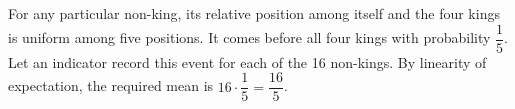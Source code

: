 For any particular non-king, its relative position among itself and the four kings is uniform among five positions. It comes before all four kings with probability $\dfrac{1}{5}$. Let an indicator record this event for each of the 16 non-kings. By linearity of expectation, the required mean is $16\cdot\dfrac{1}{5}=\boxed{\dfrac{16}{5}}$.
